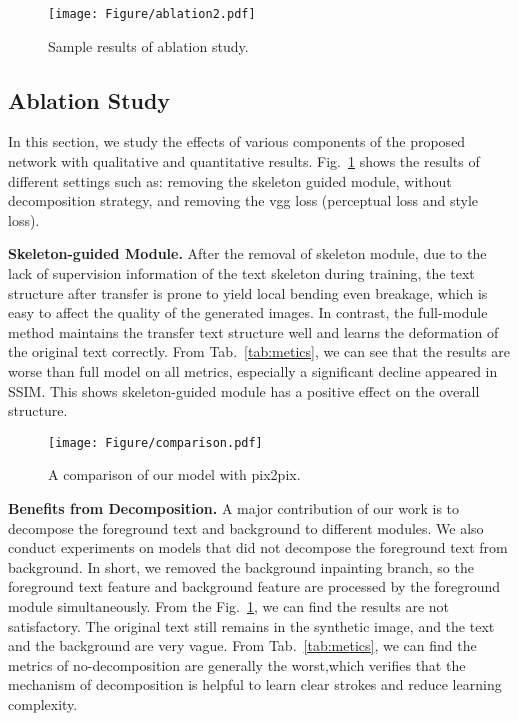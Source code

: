 \documentclass[sigconf]{acmart}
\begin{document}
\begin{figure}[t]
    \centering
    \texttt{[image: Figure/ablation2.pdf]}
\caption{Sample results of ablation study.}
\label{fig:ablation}
\vspace{-0.4cm}
\end{figure}

\subsection{Ablation Study}
\label{exp:ablation}
In this section, we study the effects of various components of the proposed network with qualitative and quantitative results. Fig.~\ref{fig:ablation} shows the results of different settings such as: removing the skeleton guided module, without decomposition strategy, and removing the vgg loss (perceptual loss and style loss).

\textbf{Skeleton-guided Module.} After the removal of skeleton module, due to the lack of supervision information of the text skeleton during training, the text structure after transfer is prone to yield local bending even breakage, which is easy to affect the quality of the generated images. In contrast, the full-module method maintains the transfer text structure well and learns the deformation of the original text correctly. From Tab.~\ref{tab:metics}, we can see that the results are worse than full model on all metrics, especially a significant decline appeared in SSIM. This shows skeleton-guided module has a positive effect on the overall structure.

\begin{figure}[t]
    \centering

    \texttt{[image: Figure/comparison.pdf]}

\caption{A comparison of our model with pix2pix.}
\label{fig:comparison}
\end{figure}
\textbf{Benefits from Decomposition.} A major contribution of our work is to decompose the foreground text and background to different modules. We also conduct experiments on models that did not decompose the foreground text from background. In short, we removed the background inpainting branch, so the foreground text feature and background feature are processed by the foreground module simultaneously. From the Fig.~\ref{fig:ablation}, we can find the results are not satisfactory. The original text still remains in the synthetic image, and the text and the background are very vague. From Tab.~\ref{tab:metics}, we can find the metrics of no-decomposition are generally the worst,which verifies that the mechanism of decomposition is helpful to learn clear strokes and reduce learning complexity.
\end{document}
